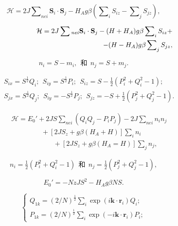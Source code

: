 \documentclass{article}
\begin{document}
\begin{equation} \label{eq:79}
\mathcal{H}=2J\sum\nolimits_{\mathit{nei}}\mathbf{S}_i\cdot\mathbf{S}_j-H_Ag\beta(\sum\nolimits_iS_{iz}-\sum\nolimits_jS_{jz}),
\end{equation}

\begin{eqnarray} \label{eq:80}
&&\mathcal{H}=2J\sum\nolinebreak_{\mathit{nei}}\mathbf{S}_i\cdot\mathbf{S}_j-(H+H_A)g\beta\sum\nolimits_iS_{iz}+\nonumber\\
&&~~~~~~~~~~~~~~~~~~~~~~~~~~~~~~~~~~~~~~~~~~~~~-(H-H_A)g\beta\sum\nolimits_jS_{jz},
\end{eqnarray}

\begin{equation} \label{eq:81}
n_i=S-m_i,~~\text{和}~~n_j=S+m_j.
\end{equation} 

\begin{eqnarray} 
&&S_{ix}=S^{\frac{1}{2}}Q_i;~~S_{iy}=S^{\frac{1}{2}}P_i;~~S_{iz}=S-\tfrac{1}{2}(P_i^2+Q_i^2-1);\label{eq:82}\\
&&S_{jx}=S^{\frac{1}{2}}Q_j;~~S_{iy}=-S^{\frac{1}{2}}P_j;~~S_{jz}=-S+\tfrac{1}{2}(P_j^2+Q_j^2-1).\label{eq:83}
\end{eqnarray} 

\begin{eqnarray} \label{eq:84}
&&\mathcal{H}=E_0'+2JS\sum\nolimits_{\mathit{nei}}(Q_iQ_j-P_iP_j)-2J\sum\nolimits_{\mathit{nei}}n_in_j\nonumber\\
&&~~~~~~~~~~~~~~~~~~~~+[2JS_z+g\beta(H_A+H)]\sum\nolimits_in_i\nonumber\\
&&~~~~~~~~~~~~~~~~~~~~~~~~~~~~+[2JS_z+g\beta(H_A=H)]\sum\nolimits_jn_j,
\end{eqnarray}

\begin{equation} \label{eq:85}
n_i=\tfrac{1}{2}(P_i^2+Q_i^2-1)~~\text{和}~~n_j=\tfrac{1}{2}(P_j^2+Q_j^2-1),
\end{equation}	

\begin{equation} \label{eq:86}
E_0'=-NzJS^2-H_Ag\beta NS.
\end{equation}

\begin{equation} \label{eq:87}
\left\{
\begin{array}{l}
Q_{1k}=(2/N)^{\frac{1}{2}}\sum\nolimits_i\exp(i\mathbf{k}\cdot\mathbf{r}_i)Q_i;\\
P_{1k}=(2/N)^{\frac{1}{2}}\sum\nolimits_i\exp(-i\mathbf{k}\cdot\mathbf{r}_i)P_i;
\end{array}
\right.
\end{equation}
\end{document}

